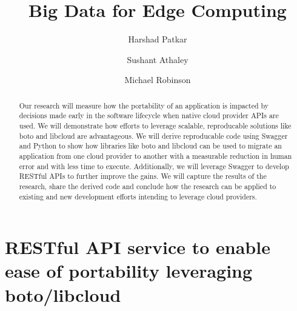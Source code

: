 
\title{Big Data for Edge Computing}


\author{Harshad Patkar}

\author{Sushant Athaley}

\author{Michael Robinson}


\renewcommand{\shortauthors}{G. v. Laszewski}


\begin{abstract}
Our research will measure how the portability of an application is
impacted by decisions made early in the software lifecycle when native
cloud provider APIs are used. We will demonstrate how efforts to
leverage scalable, reproducable solutions like boto and libcloud are
advantageous. We will derive reproducable code using Swagger and Python
to show how libraries like boto and libcloud can be used to migrate an
application from one cloud provider to another with a measurable
reduction in human error and with less time to execute. Additionally, we
will leverage Swagger to develop RESTful APIs to further improve the
gains. We will capture the results of the research, share the derived
code and conclude how the research can be applied to existing and new
development efforts intending to leverage cloud providers. 
\end{abstract}



\maketitle

\section{RESTful API service to enable ease of portability leveraging
  boto/libcloud}


